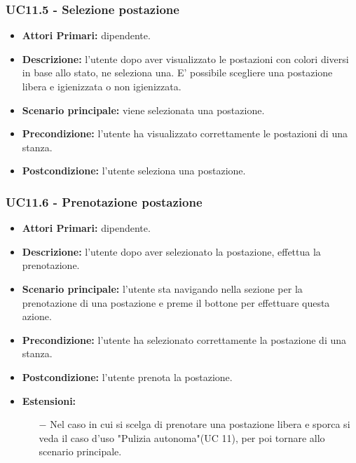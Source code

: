 \subsubsection{ UC11.5 - Selezione postazione }
\begin{itemize}
	\item\textbf{Attori Primari:} dipendente.
	\item\textbf{Descrizione:} l’utente dopo aver visualizzato le postazioni con colori diversi in base allo stato, ne seleziona una. E' possibile scegliere una postazione libera e igienizzata o non igienizzata.
	\item\textbf{Scenario principale:} viene selezionata una postazione.
	\item\textbf{Precondizione:} l’utente ha visualizzato correttamente le postazioni di una stanza.
	\item\textbf{Postcondizione:} l’utente seleziona una postazione.
\end{itemize}
\subsubsection{ UC11.6 - Prenotazione postazione }
\begin{itemize}
	\item\textbf{Attori Primari:} dipendente.
	\item\textbf{Descrizione:} l’utente dopo aver selezionato la postazione, effettua la prenotazione. 
	\item\textbf{Scenario principale:} l’utente sta navigando nella sezione per la prenotazione di una postazione
	e preme il bottone per effettuare questa azione.
	\item\textbf{Precondizione:} l’utente ha selezionato correttamente la postazione di una stanza.
	\item\textbf{Postcondizione:} l'utente prenota la postazione.
	\item\textbf{Estensioni:}
	\begin{itemize}
		\item[$-$] Nel caso in cui si scelga di prenotare una postazione libera e sporca si veda il caso d'uso "Pulizia autonoma"(UC 11),
		per poi tornare allo scenario principale.
	\end{itemize}
\end{itemize}
